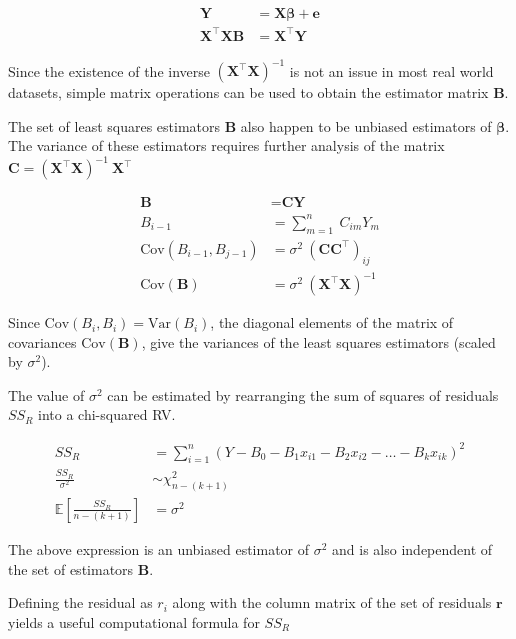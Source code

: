 \begin{align}
	\textbf{Y} &= \textbf{X} \boldsymbol{\beta} + \textbf{e} \\
	\textbf{X}^\intercal \textbf{X} \textbf{B} &= \textbf{X}^\intercal \textbf{Y} 
\end{align}

Since the existence of the inverse $ (\textbf{X}^\intercal \textbf{X})^{-1}  $ is not an issue in most real world datasets, simple matrix operations can be used to obtain the estimator matrix $ \textbf{B} $.

The set of least squares estimators $ \textbf{B} $ also happen to be unbiased estimators of $ \boldsymbol{\beta} $. The variance of these estimators requires further analysis of the matrix $ \textbf{C} = (\textbf{X}^\intercal \textbf{X})^{-1}\  \textbf{X}^\intercal$

\begin{align}
	\textbf{B} &= \textbf{C}\textbf{Y} \nonumber \\
	B_{i-1} &= \sum\limits_{m = 1}^{n}\ C_{im} Y_m \\
	\mathrm{Cov}(B_{i-1}, B_{j-1}) &= \sigma^2\ (\textbf{C} \textbf{C}^\intercal)_{ij} \\
	\mathrm{Cov}(\textbf{B}) &= \sigma^2\ (\textbf{X}^\intercal \textbf{X})^{-1} 
\end{align}

Since $ \mathrm{Cov}(B_i, B_i) = \mathrm{Var}(B_i) $, the diagonal elements of the matrix of covariances $ \mathrm{Cov}(\textbf{B}) $, give the variances of the least squares estimators (scaled by $ \sigma^2 $).

The value of $ \sigma^2 $ can be estimated by rearranging the sum of squares of residuals $ SS_R $ into a chi-squared RV.

\begin{align}
	SS_R &= \sum\limits_{i = 1}^{n} (Y - B_0 - B_1 x_{i1} - B_2 x_{i2} - \dots - B_k x_{ik})^2 \nonumber \\
	\frac{SS_R}{\sigma^2} &\sim \chi^2_{n-(k+1)} \\
	\mathbb{E}\left[\frac{SS_R}{n- (k+1)}\right] &= \sigma^2
\end{align}

The above expression is an unbiased estimator of $ \sigma^2 $ and is also independent of the set of estimators $ \textbf{B} $.

Defining the residual as $ r_i $ along with the column matrix of the set of residuals $ \textbf{r} $ yields a useful computational formula for $ SS_R $ 

